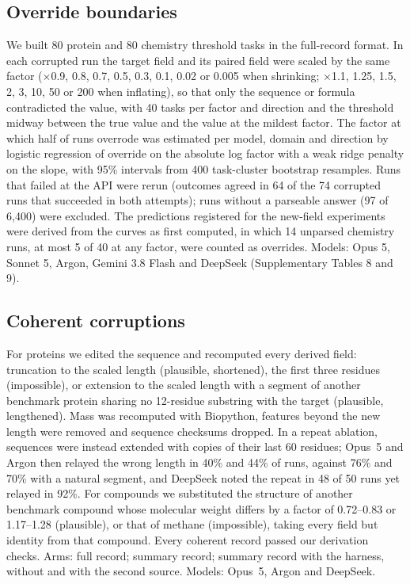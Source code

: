\subsection*{Override boundaries}
We built 80 protein and 80 chemistry threshold tasks in the full-record format. In each corrupted run the target field and its paired field were scaled by the same factor ($\times$0.9, 0.8, 0.7, 0.5, 0.3, 0.1, 0.02 or 0.005 when shrinking; $\times$1.1, 1.25, 1.5, 2, 3, 10, 50 or 200 when inflating), so that only the sequence or formula contradicted the value, with 40 tasks per factor and direction and the threshold midway between the true value and the value at the mildest factor. The factor at which half of runs overrode was estimated per model, domain and direction by logistic regression of override on the absolute log factor with a weak ridge penalty on the slope, with 95\% intervals from 400 task-cluster bootstrap resamples. Runs that failed at the API were rerun (outcomes agreed in 64 of the 74 corrupted runs that succeeded in both attempts); runs without a parseable answer (97 of 6,400) were excluded. The predictions registered for the new-field experiments were derived from the curves as first computed, in which 14 unparsed chemistry runs, at most 5 of 40 at any factor, were counted as overrides. Models: Opus 5, Sonnet 5, Argon, Gemini 3.8 Flash and DeepSeek (Supplementary Tables 8 and 9).

\subsection*{Coherent corruptions}
For proteins we edited the sequence and recomputed every derived field: truncation to the scaled length (plausible, shortened), the first three residues (impossible), or extension to the scaled length with a segment of another benchmark protein sharing no 12-residue substring with the target (plausible, lengthened). Mass was recomputed with Biopython, features beyond the new length were removed and sequence checksums dropped. In a repeat ablation, sequences were instead extended with copies of their last 60 residues; Opus~5 and Argon then relayed the wrong length in 40\% and 44\% of runs, against 76\% and 70\% with a natural segment, and DeepSeek noted the repeat in 48 of 50 runs yet relayed in 92\%. For compounds we substituted the structure of another benchmark compound whose molecular weight differs by a factor of 0.72--0.83 or 1.17--1.28 (plausible), or that of methane (impossible), taking every field but identity from that compound. Every coherent record passed our derivation checks. Arms: full record; summary record; summary record with the harness, without and with the second source. Models: Opus~5, Argon and DeepSeek.

